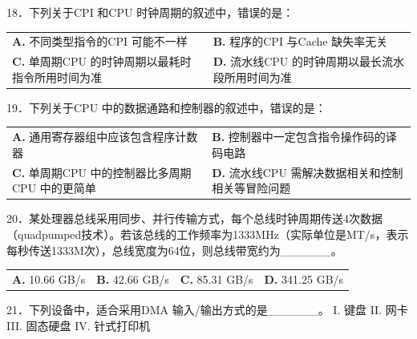 \documentclass[UTF8,11pt]{ctexart}
\begin{document}
18．下列关于CPI 和CPU 时钟周期的叙述中，错误的是：


\begin{center}\begin{tabular}{>{\raggedright\arraybackslash}p{\dimexpr(\linewidth-4\tabcolsep)/2\relax}>{\raggedright\arraybackslash}p{\dimexpr(\linewidth-4\tabcolsep)/2\relax}}
\textbf{A.} 不同类型指令的CPI 可能不一样 & \textbf{B.} 程序的CPI 与Cache 缺失率无关\\[.35em]
\textbf{C.} 单周期CPU 的时钟周期以最耗时指令所用时间为准 & \textbf{D.} 流水线CPU 的时钟周期以最长流水段所用时间为准\\[.35em]\end{tabular}\end{center}

19．下列关于CPU 中的数据通路和控制器的叙述中，错误的是：


\begin{center}\begin{tabular}{>{\raggedright\arraybackslash}p{\dimexpr(\linewidth-4\tabcolsep)/2\relax}>{\raggedright\arraybackslash}p{\dimexpr(\linewidth-4\tabcolsep)/2\relax}}
\textbf{A.} 通用寄存器组中应该包含程序计数器 & \textbf{B.} 控制器中一定包含指令操作码的译码电路\\[.35em]
\textbf{C.} 单周期CPU 中的控制器比多周期CPU 中的更简单 & \textbf{D.} 流水线CPU 需解决数据相关和控制相关等冒险问题\\[.35em]\end{tabular}\end{center}

20．某处理器总线采用同步、并行传输方式，每个总线时钟周期传送4次数据（quadpumped技术）。若该总线的工作频率为1333MHz（实际单位是MT/s，表示每秒传送1333M次），总线宽度为64位，则总线带宽约为\_\_\_\_\_\_。


\begin{center}\begin{tabular}{>{\raggedright\arraybackslash}p{\dimexpr(\linewidth-8\tabcolsep)/4\relax}>{\raggedright\arraybackslash}p{\dimexpr(\linewidth-8\tabcolsep)/4\relax}>{\raggedright\arraybackslash}p{\dimexpr(\linewidth-8\tabcolsep)/4\relax}>{\raggedright\arraybackslash}p{\dimexpr(\linewidth-8\tabcolsep)/4\relax}}
\textbf{A.} 10.\allowbreak{}66 GB/s & \textbf{B.} 42.\allowbreak{}66 GB/s & \textbf{C.} 85.\allowbreak{}31 GB/s & \textbf{D.} 341.\allowbreak{}25 GB/s\\[.35em]\end{tabular}\end{center}

21．下列设备中，适合采用DMA 输入/输出方式的是\_\_\_\_\_\_。 I. 键盘 II. 网卡 III. 固态硬盘 IV. 针式打印机
\end{document}
